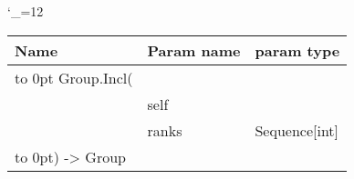 \begingroup \catcode`\_=12 \tt
\begin{tabular}{lll}
\toprule
\textrm{Name}&\textrm{Param name}&\textrm{param type}\\
\midrule
\hbox to 0pt {Group.Incl(\hss}\\
& self\\
& ranks & Sequence[int]\\
\hbox to 0pt{) -> Group\hss}\\
\bottomrule
\end{tabular}
\endgroup
